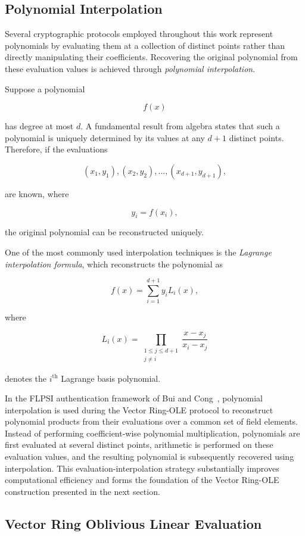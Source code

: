 \documentclass[11pt,a4paper]{article}
\begin{document}
\subsection{Polynomial Interpolation}

Several cryptographic protocols employed throughout this work represent
polynomials by evaluating them at a collection of distinct points rather
than directly manipulating their coefficients. Recovering the original
polynomial from these evaluation values is achieved through
\textit{polynomial interpolation}.

Suppose a polynomial

\[
f(x)
\]

has degree at most $d$. A fundamental result from algebra states that
such a polynomial is uniquely determined by its values at any
$d+1$ distinct points. Therefore, if the evaluations

\[
(x_1,y_1), (x_2,y_2), \ldots, (x_{d+1},y_{d+1}),
\]

are known, where

\[
y_i=f(x_i),
\]

the original polynomial can be reconstructed uniquely.

One of the most commonly used interpolation techniques is the
\textit{Lagrange interpolation formula}, which reconstructs the polynomial as

\[
f(x)=\sum_{i=1}^{d+1} y_iL_i(x),
\]

where

\[
L_i(x)=
\prod_{\substack{1\le j\le d+1\\j\neq i}}
\frac{x-x_j}{x_i-x_j}
\]

denotes the $i^{\text{th}}$ Lagrange basis polynomial.

In the FLPSI authentication framework of Bui and Cong~\cite{BuiCong25}, polynomial interpolation is
used during the Vector Ring-OLE protocol to reconstruct polynomial
products from their evaluations over a common set of field elements.
Instead of performing coefficient-wise polynomial multiplication,
polynomials are first evaluated at several distinct points, arithmetic is
performed on these evaluation values, and the resulting polynomial is
subsequently recovered using interpolation. This evaluation-interpolation
strategy substantially improves computational efficiency and forms the
foundation of the Vector Ring-OLE construction presented in the next
section.
\subsection{Vector Ring Oblivious Linear Evaluation}
\end{document}

